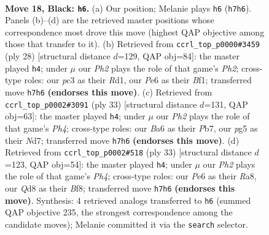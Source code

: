 \documentclass[11pt]{article}
\begin{document}
\begin{figure}[p]
\label{fig:thought-m33}
\end{figure}

\clearpage

\begin{figure}[p]\centering
\begin{subfigure}{0.46\textwidth}\centering
\resizebox{\linewidth}{!}{%
\newchessgame
\chessboard[
  setfen={rn1qkb1r/p6p/b1p1p1p1/P1PpP1P1/1P3P2/2P5/3N4/R1BQK1NR b KQq - 0 18},
  showmover=false,
  pgfstyle=straightmove, color=movearrow, markmove={h7-h6}
]}
\caption{}
\end{subfigure}\hfill
\begin{subfigure}{0.46\textwidth}\centering
\resizebox{\linewidth}{!}{%
\newchessgame
\chessboard[
  setfen={2r1k2r/ppqnbpp1/2n1p1p1/3p4/3P2P1/1QN1PP2/PP1B3P/1K1R1B1R w k - 4 15},
  showmover=false,
  pgfstyle=straightmove, color=movearrow, markmove={h2-h4}
]}
\caption{}
\end{subfigure}
\\[4pt]
\begin{subfigure}{0.46\textwidth}\centering
\resizebox{\linewidth}{!}{%
\newchessgame
\chessboard[
  setfen={r2qkb1r/pp1n1p2/2p1b3/P2p2pp/1P1P4/2N1P1P1/2QN1PP1/1R2KB1R b Kkq - 0 17},
  showmover=false,
  pgfstyle=straightmove, color=movearrow, markmove={h5-h4}
]}
\caption{}
\end{subfigure}\hfill
\begin{subfigure}{0.46\textwidth}\centering
\resizebox{\linewidth}{!}{%
\newchessgame
\chessboard[
  setfen={r3kb1r/pp3p2/1np1bq2/3p2pp/1P1P4/PNNBP1P1/2Q2PP1/1R2K2R b Kkq - 3 17},
  showmover=false,
  pgfstyle=straightmove, color=movearrow, markmove={h5-h4}
]}
\caption{}
\end{subfigure}
\caption{\textbf{Move 18, Black: \texttt{h6}.} (a) Our position; Melanie plays \texttt{h6} (\texttt{h7h6}). Panels (b)--(d) are the retrieved master positions whose correspondence most drove this move (highest QAP objective among those that transfer to it). (b) Retrieved from \texttt{ccrl\_top\_p0000\#3459} (ply 28) [structural distance $d$=129, QAP obj=84]: the master played \texttt{h4}; under $\mu$ our \emph{Ph2} plays the role of that game's \emph{Ph2}; cross-type roles: our \emph{p}c3 as their \emph{R}d1, our \emph{P}e6 as their \emph{B}f1; transferred move \texttt{h7h6} \textbf{(endorses this move)}. (c) Retrieved from \texttt{ccrl\_top\_p0002\#3091} (ply 33) [structural distance $d$=131, QAP obj=63]: the master played \texttt{h4}; under $\mu$ our \emph{Ph2} plays the role of that game's \emph{Ph4}; cross-type roles: our \emph{B}a6 as their \emph{P}b7, our \emph{p}g5 as their \emph{N}d7; transferred move \texttt{h7h6} \textbf{(endorses this move)}. (d) Retrieved from \texttt{ccrl\_top\_p0002\#518} (ply 33) [structural distance $d$=123, QAP obj=54]: the master played \texttt{h4}; under $\mu$ our \emph{Ph2} plays the role of that game's \emph{Ph4}; cross-type roles: our \emph{P}e6 as their \emph{R}a8, our \emph{Q}d8 as their \emph{B}f8; transferred move \texttt{h7h6} \textbf{(endorses this move)}. Synthesis: 4 retrieved analogs transferred to \texttt{h6} (summed QAP objective 235, the strongest correspondence among the candidate moves); Melanie committed it via the \texttt{search} selector.}

\end{figure}
\end{document}
